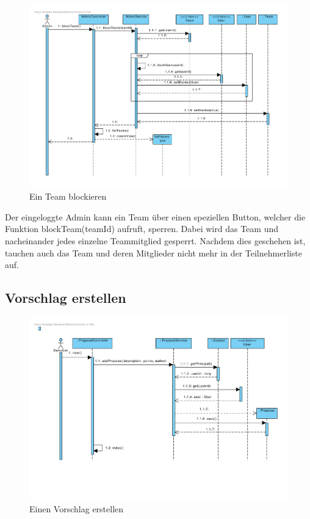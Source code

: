 \begin{figure}[H]
  \centering
  \includegraphics[width=\textwidth, clip]{gfx/team_blockieren}
  \caption{Ein Team blockieren}
\end{figure}

Der eingeloggte Admin kann ein Team über einen speziellen Button, welcher die Funktion blockTeam(teamId) aufruft, sperren. Dabei wird das Team und nacheinander jedes einzelne Teammitglied gesperrt. Nachdem dies geschehen ist, tauchen auch das Team und deren Mitglieder nicht mehr in der Teilnehmerliste auf.\\

\subsection{Vorschlag erstellen}

\begin{figure}[H]
  \centering
  \includegraphics[width=\textwidth, clip]{gfx/vorschlag_erstellen}
  \caption{Einen Vorschlag erstellen}
\end{figure}

